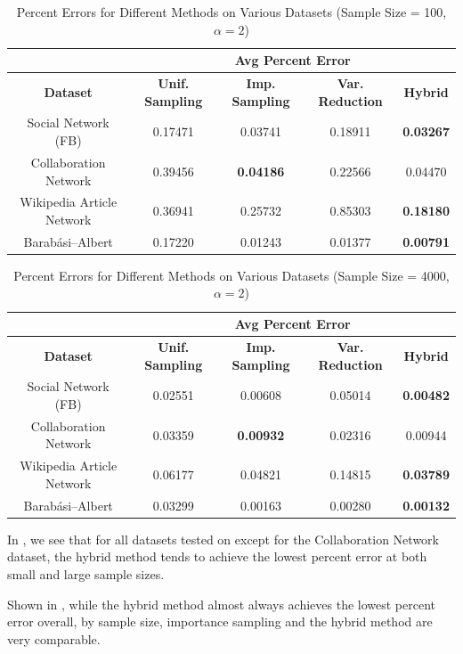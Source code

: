 \documentclass[11pt, margin=1in]{article}
\begin{document}
\begin{table}[ht]
\centering
\caption{Percent Errors for Different Methods on Various Datasets (Sample Size = 100, $\alpha = 2$)}
\label{tab:percent_error_100}
\begin{tabular}{|c|c|c|c|c|}
\hline
& \multicolumn{4}{c|}{\textbf{Avg Percent Error}} \\
\hline
\textbf{Dataset} & \textbf{Unif. Sampling} & \textbf{Imp. Sampling} & \textbf{Var. Reduction} & \textbf{Hybrid} \\
\hline
Social Network (FB) & 0.17471 & 0.03741 & 0.18911 & \textbf{0.03267} \\
Collaboration Network & 0.39456 & \textbf{0.04186} & 0.22566 & 0.04470 \\
Wikipedia Article Network & 0.36941 & 0.25732 & 0.85303 & \textbf{0.18180} \\
Barab\'asi--Albert & 0.17220 & 0.01243 & 0.01377 & \textbf{0.00791} \\
\hline
\end{tabular}
\end{table}

\begin{table}[ht]
\centering
\caption{Percent Errors for Different Methods on Various Datasets (Sample Size = 4000, $\alpha = 2$)}
\label{tab:percent_error_4000}
\begin{tabular}{|c|c|c|c|c|}
\hline
& \multicolumn{4}{c|}{\textbf{Avg Percent Error}} \\
\hline
\textbf{Dataset} & \textbf{Unif. Sampling} & \textbf{Imp. Sampling} & \textbf{Var. Reduction} & \textbf{Hybrid} \\
\hline
Social Network (FB) & 0.02551 & 0.00608 & 0.05014 & \textbf{0.00482} \\
Collaboration Network & 0.03359 & \textbf{0.00932} & 0.02316 & 0.00944 \\
Wikipedia Article Network & 0.06177 & 0.04821 & 0.14815 & \textbf{0.03789} \\
Barab\'asi--Albert & 0.03299 & 0.00163 & 0.00280 & \textbf{0.00132} \\
\hline
\end{tabular}
\end{table}

In , we see that for all datasets tested on except for the Collaboration Network dataset, the hybrid method tends to achieve the lowest percent error at both small and large sample sizes.

Shown in , while the hybrid method almost always achieves the lowest percent error overall, by sample size, importance sampling and the hybrid method are very comparable.
\end{document}

